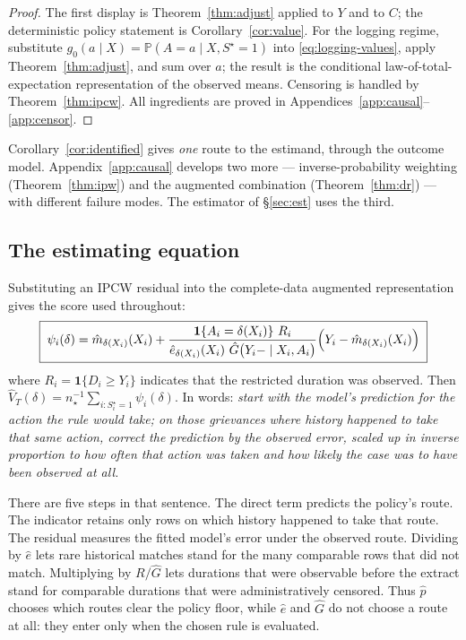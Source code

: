 \documentclass[11pt,a4paper]{article}
\theoremstyle{plain}
\theoremstyle{definition}
\theoremstyle{remark}
\newcommand{\Prob}{\mathbb P}
\newcommand{\one}[1]{\mathbf 1\{#1\}}
\newcommand{\Sstar}{S^{\star}}
\begin{document}
\begin{proof}
The first display is Theorem~\ref{thm:adjust} applied to $Y$ and to $C$; the deterministic
policy statement is Corollary~\ref{cor:value}. For the logging regime, substitute
$g_0(a\mid X)=\Prob(A=a\mid X,\Sstar=1)$ into \eqref{eq:logging-values}, apply
Theorem~\ref{thm:adjust}, and sum over $a$; the result is the conditional law-of-total-
expectation representation of the observed means. Censoring is handled by
Theorem~\ref{thm:ipcw}. All ingredients are proved in
Appendices~\ref{app:causal}--\ref{app:censor}.
\end{proof}

Corollary~\ref{cor:identified} gives \emph{one} route to the estimand, through the outcome
model. Appendix~\ref{app:causal} develops two more --- inverse-probability weighting
(Theorem~\ref{thm:ipw}) and the augmented combination (Theorem~\ref{thm:dr}) --- with different
failure modes. The estimator of \S\ref{sec:est} uses the third.

\subsection{The estimating equation}

Substituting an IPCW residual into the complete-data augmented representation gives the score
used throughout:
\begin{equation}
\boxed{\;
\psi_i(\delta)
=\hat m_{\delta(X_i)}(X_i)
+\frac{\one{A_i=\delta(X_i)}\ R_i}
      {\hat e_{\delta(X_i)}(X_i)\ \hat G\bigl(Y_i-\mid X_i,A_i\bigr)}
\Bigl(Y_i-\hat m_{\delta(X_i)}(X_i)\Bigr)\;}
\label{eq:score}
\end{equation}
where $R_i=\one{D_i\ge Y_i}$ indicates that the restricted duration was observed. Then
$\hat V_T(\delta)=n_\star^{-1}\sum_{i:\Sstar_i=1}\psi_i(\delta)$. In words: \emph{start with the model's
prediction for the action the rule would take; on those grievances where history happened to
take that same action, correct the prediction by the observed error, scaled up in inverse
proportion to how often that action was taken and how likely the case was to have been observed
at all.}

There are five steps in that sentence. The direct term predicts the policy's route. The indicator
retains only rows on which history happened to take that route. The residual measures the fitted
model's error under the observed route. Dividing by $\hat e$ lets rare historical matches stand
for the many comparable rows that did not match. Multiplying by $R/\hat G$ lets durations that
were observable before the extract stand for comparable durations that were administratively
censored. Thus $\hat p$ chooses which routes clear the policy floor, while $\hat e$ and $\hat G$
do not choose a route at all: they enter only when the chosen rule is evaluated.
\end{document}
